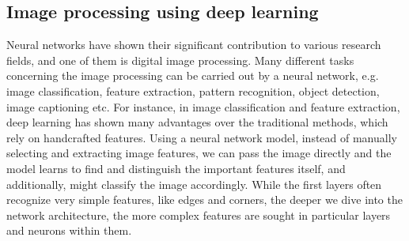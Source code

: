 \subsection{Image processing using deep learning}
Neural networks have shown their significant contribution to various research fields, and one of them is digital image processing. Many different tasks concerning the image processing can be carried out by a neural network, e.g. image classification, feature extraction, pattern recognition, object detection, image captioning etc. For instance, in image classification and feature extraction, deep learning has shown many advantages over the traditional methods, which rely on handcrafted features. Using a neural network model, instead of manually selecting and extracting image features, we can pass the image directly and the model learns to find and distinguish the important features itself, and additionally, might classify the image accordingly. While the first layers often recognize very simple features, like edges and corners, the deeper we dive into the network architecture, the more complex features are sought in particular layers and neurons within them.


